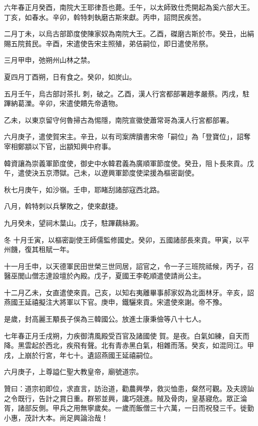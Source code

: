 \begin{pinyinscope}
 六年春正月癸酉，南院大王耶律吾也薨。壬午，以太師致仕禿開起為奚六部大王。丁亥，如春水。辛卯，斡特刺執磨古斯來獻。丙申，詔問民疾苦。



 二月丁未，以烏古部節度使陳家奴為南院大王。乙酉，磔磨古斯於市。癸丑，出絹賜五院貧民。辛酉，宋遣使告宋主照殖，弟佶嗣位，即日遣使吊祭。



 三月甲申，弛朔州山林之禁。



 夏四月丁酉朔，日有食之。癸卯，如炭山。



 五月壬午，烏古部討茶扎
 刺，破之。乙酉，漢人行宮都部署趙孝嚴蔡。丙戌，駐蹕納葛濼。辛卯，宋遣使饋先帝遺物。



 乙未，以東京留守何魯掃古為惕隱，南院宣徽使蕭常哥為漢人行宮都部署。



 六月庚子，遣使賀宋主。辛丑，以有司案牌牘書宋帝「嗣位」為「登寶位」，詔奪宰相鄭顓以下官，出顓知興中府事。



 韓資讓為崇義軍節度使，御史中水韓君義為廣順軍節度使。癸丑，阻卜長來貢。戊午，遣使決五京滯獄。己未，以遼興軍節度使梁援為樞密副使。



 秋七月庚午，如沙嶺。壬申，耶睹刮諸部寇西北路。



 八月，斡特刺以兵擊敗之，使來獻捷。



 九月癸未，望祠木葉山。戊子，駐蹕藕絲澱。



 冬
 十月壬寅，以樞密副使王師儒監修國史。癸卯，五國諸部長來貢。甲寅，以平州饑，復其租賦一年。



 十一月壬申，以天德軍民田世榮三世同居，詔官之，令一子三班院祗候，丙子，召醫巫閭山僧志達設壇於內殿。戊子，夏國王李乾順遣使請尚公主。



 十二月乙未，女直遣使來貢。己亥，以知右夷離畢事郝家奴為北面林牙。辛亥，詔燕國王延禧擬注大將軍以下官。庚申，鐵驪來貢。宋遣使來謝。帝不豫。



 是歲，封高麗王顒長子俁為三韓國公。放進士康秉儉等八十七人。



 七年春正月壬戌朔，力疾御清風殿受百官及諸國使
 賀。是夜。白氣如練，自天而降。黑雲起於西北，疾飛有聲。北有青赤黑白氣，相雜而落。癸亥，如混同江。甲戌，上崩於行宮，年七十。遺詔燕國王延禧嗣位。



 六月庚子，上尊謚仁聖大教皇帝，廟號道宗。



 贊曰：道宗初即位，求直言，訪治道，勸農興學，救災恤患，粲然可觀。及夫謗訕之令既行，告計之賞日重。群邪並興，讒巧競進。賊及骨肉，皇基寢危。眾正淪胥，諸部反側。甲兵之用無寧歲矣。一歲而飯僧三十六萬，一日而祝發三千。徙勤小惠，茂計大本。尚足興論治哉！



\end{pinyinscope}